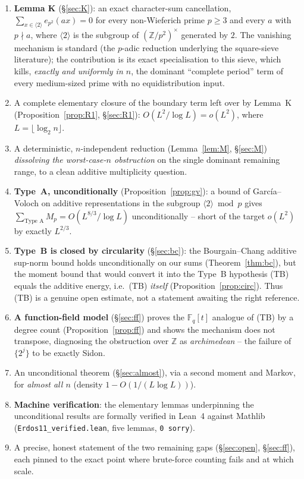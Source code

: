 \documentclass[11pt]{article}
\theoremstyle{plain}
\theoremstyle{definition}
\theoremstyle{remark}
\newcommand{\Z}{\mathbb{Z}}
\newcommand{\F}{\mathbb{F}}
\begin{document}
\begin{enumerate}
\item \textbf{Lemma K} (\S\ref{sec:K}): an exact character-sum cancellation,
$\sum_{x\in\langle2\rangle}e_{p^2}(ax)=0$ for every non-Wieferich prime $p\ge3$
and every $a$ with $p\nmid a$, where $\langle2\rangle$ is the subgroup of
$(\Z/p^2)^\times$ generated by $2$. The vanishing mechanism is standard (the
$p$-adic reduction underlying the square-sieve literature); the contribution is
its exact specialisation to this sieve, which kills, \emph{exactly and uniformly
in $n$}, the dominant ``complete period'' term of every medium-sized prime with
no equidistribution input.
\item A complete elementary closure of the boundary term left over by
Lemma~K (Proposition~\ref{prop:R1}, \S\ref{sec:R1}): $O(L^2/\log L)=o(L^2)$,
where $L=\lfloor\log_2n\rfloor$.
\item A deterministic, $n$-independent reduction (Lemma~\ref{lem:M},
\S\ref{sec:M}) \emph{dissolving the worst-case-$n$ obstruction} on the single
dominant remaining range, to a clean additive multiplicity question.
\item \textbf{Type~A, unconditionally} (Proposition~\ref{prop:gv}): a bound of
García--Voloch on additive representations in the subgroup $\langle2\rangle\bmod
p$ gives $\sum_{\text{Type A}}M_p=O(L^{8/3}/\log L)$ unconditionally -- short of
the target $o(L^2)$ by exactly $L^{2/3}$.
\item \textbf{Type~B is closed by circularity} (\S\ref{sec:bc}): the
Bourgain--Chang additive sup-norm bound holds unconditionally on our sums
(Theorem~\ref{thm:bc}), but the moment bound that would convert it into the
Type~B hypothesis (TB) equals the additive energy, i.e.\ (TB) \emph{itself}
(Proposition~\ref{prop:circ}). Thus (TB) is a genuine open estimate, not a
statement awaiting the right reference.
\item \textbf{A function-field model} (\S\ref{sec:ff}) proves the $\F_q[t]$
analogue of (TB) by a degree count (Proposition~\ref{prop:ff}) and shows the
mechanism does not transpose, diagnosing the obstruction over $\Z$ as
\emph{archimedean} -- the failure of $\{2^j\}$ to be exactly Sidon.
\item An unconditional theorem (\S\ref{sec:almost}), via a second moment and
Markov, for \emph{almost all $n$} (density $1-O(1/(L\log L))$).
\item \textbf{Machine verification}: the elementary lemmas underpinning the
unconditional results are formally verified in Lean~4 against Mathlib
(\texttt{Erdos11\_verified.lean}, five lemmas, \texttt{0 sorry}).
\item A precise, honest statement of the two remaining gaps
(\S\ref{sec:open}, \S\ref{sec:ff}), each pinned to the exact point where
brute-force counting fails and at which scale.
\end{enumerate}
\end{document}
